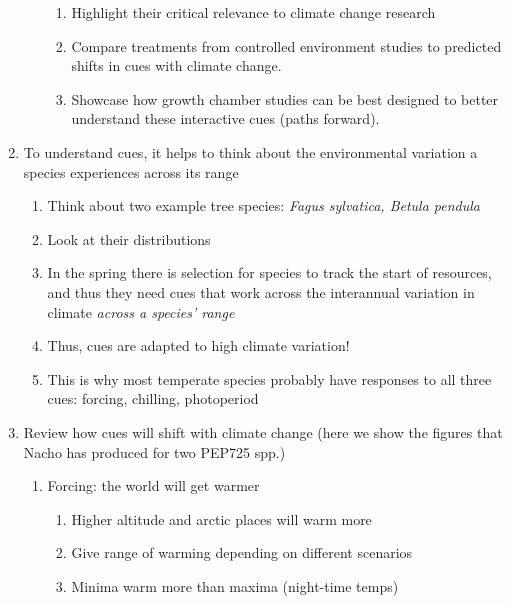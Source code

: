 \documentclass[11pt,letterpaper]{article}
\begin{document}
\begin{enumerate}
\begin{enumerate}
\begin{enumerate}
\item Highlight their critical relevance to climate change research 
\item Compare treatments from controlled environment studies to predicted shifts in cues with climate change.  
\item Showcase how growth chamber studies can be best designed to better understand these interactive cues (paths forward). 
\end{enumerate}
\end{enumerate}
\item To understand cues, it helps to think about the environmental variation a species experiences across its range
\begin{enumerate}
\item Think about two example tree species: \emph{Fagus sylvatica, Betula pendula}
\item Look at their distributions
\item In the spring there is selection for species to track the start of resources, and thus they need cues that work across the interannual variation in climate \emph{across a species' range} %
\item Thus, cues are adapted to high climate variation! 
\item This is why most temperate species probably have responses to all three cues: forcing, chilling, photoperiod
\end{enumerate}
\item Review how cues will shift with climate change (here we show the figures that Nacho has produced for two PEP725 spp.)
\begin{enumerate}
\item Forcing: the world will get warmer %
\begin{enumerate}
\item Higher altitude and arctic places will warm more
\item Give range of warming depending on different scenarios
\item Minima warm more than maxima (night-time temps)

\end{enumerate}
\end{enumerate}
\end{enumerate}
\end{document}
